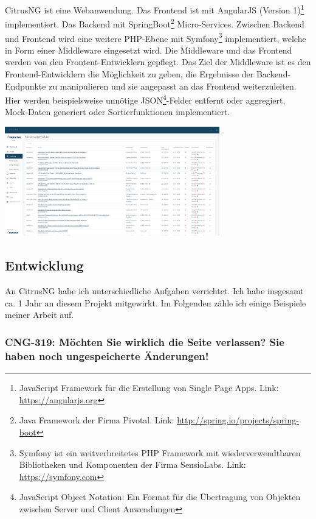 \documentclass[chapterprefix=false, 12pt, a4paper, oneside, parskip=half, listof=totoc, bibliography=totoc, numbers=noendperiod]{scrbook}
\begin{document}
    CitrusNG ist eine Webanwendung. Das Frontend ist mit AngularJS (Version 1)\footnote{JavaScript Framework für die Erstellung von
    Single Page Apps. Link: \url{https://angularjs.org}} implementiert.
    Das Backend mit SpringBoot\footnote{Java Framework der Firma Pivotal. Link: \url{http://spring.io/projects/spring-boot}} Micro-Services.
    Zwischen Backend und Frontend wird eine weitere PHP-Ebene mit Symfony\footnote{Symfony ist ein weitverbreitetes
    PHP Framework mit wiederverwendtbaren Bibliotheken und Komponenten der Firma SensioLabs. Link: \url{https://symfony.com}}
    implementiert, welche in Form einer Middleware eingesetzt wird. Die Middleware und das Frontend werden von den Frontent-Entwicklern gepflegt.
    Das Ziel der Middleware ist es den Frontend-Entwicklern die Möglichkeit zu geben, die Ergebnisse der
    Backend-Endpunkte zu manipulieren und sie angepasst an das Frontend weiterzuleiten. 
    Hier werden beispielsweise unnötige JSON\footnote{JavaScript Object Notation: Ein Format für die Übertragung von
    Objekten zwischen Server und Client Anwendungen}-Felder entfernt oder
    aggregiert, Mock-Daten generiert oder Sortierfunktionen implementiert.

    \begin{center}
        \includegraphics[width=0.70\textwidth]{img/citrusng.png}
    \end{center}

    \subsection{Entwicklung}

    An CitrusNG habe ich unterschiedliche Aufgaben verrichtet. Ich habe insgesamt ca. 1 Jahr an diesem Projekt mitgewirkt.
    Im Folgenden zähle ich einige Beispiele meiner Arbeit auf.

    \subsubsection{CNG-319: Möchten Sie wirklich die Seite verlassen? Sie haben noch ungespeicherte Änderungen!}
\end{document}
